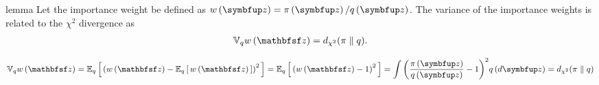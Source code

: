 
\begin{theoremEnd}{lemma}\label{thm:iw_variance}
  Let the importance weight be defined as \(w\left(\vz\right) = \pi\left(\vz\right)/q\left(\vz\right)\).
  The variance of the importance weights is related to the \(\chi^2\) divergence as
  \begin{align*}
    \mathbb{V}_{q}{w\left(\rvvz\right)}
    =
    \DChi{\pi}{q}.
  \end{align*}
\end{theoremEnd}
\begin{proofEnd}
  {
  \begin{alignat}{2}
    \mathbb{V}_{q}{w\left(\rvvz\right)}
    =
    \Esub{q}{
      {\left(
        w\left(\rvvz\right)
      -
      \Esub{q}{
        w\left(\rvvz\right)
      }
      \right)}^2
    }
    =
    \Esub{q}{
      {\left(
      w\left(\rvvz\right)
      -
      1
      \right)}^2
    }
    =
    \int {\left( \frac{\pi\left(\vz\right)}{q\left(\vz\right)}  - 1 \right)}^2 q\left(d\vz\right)
    =
    \DChi{\pi}{q}
    \nonumber
  \end{alignat}
  }
\end{proofEnd}

